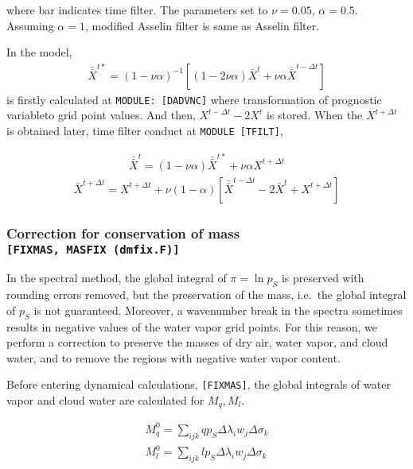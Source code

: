 where bar indicates time filter. The parameters set to \(\nu=0.05\),
\(\alpha=0.5\). Assuming \(\alpha=1\), modified Asselin filter is same
as Asselin filter.

In the model, \begin{eqnarray}
 \bar{\bar{X}}^{t*} = (1-\nu\alpha)^{-1}[(1-2\nu\alpha)\bar{X}^t +\nu\alpha \bar{\bar{X}}^{t-\Delta t} ]
\end{eqnarray} is firstly calculated at \texttt{MODULE:\ {[}DADVNC{]}} where
transformation of prognostic variableto grid point values. And then,
\(X^{t-\Delta t}-2X^t\) is stored. When the \(X^{t+\Delta t}\) is
obtained later, time filter conduct at \texttt{MODULE\ {[}TFILT{]}},

\begin{eqnarray}
 \bar{\bar{X}}^{t} = (1-\nu\alpha)\bar{\bar{X}}^{t*} +\nu\alpha X^{t+\Delta t} 
\end{eqnarray} \begin{eqnarray}
\bar{X}^{t+\Delta t} = X^{t+\Delta t} + \nu (1-\alpha)[ \bar{\bar{X}}^{t-\Delta t} - 2\bar{X}^{t} + X^{t+\Delta t}]
 \end{eqnarray}

\hypertarget{correction-for-conservation-of-mass-fixmas-masfix-dmfix.f}{%
\subsubsection{\texorpdfstring{Correction for conservation of mass
\texttt{{[}FIXMAS,\ MASFIX\ (dmfix.F){]}}}{Correction for conservation of mass {[}FIXMAS, MASFIX (dmfix.F){]}}}\label{correction-for-conservation-of-mass-fixmas-masfix-dmfix.f}}

In the spectral method, the global integral of \(\pi = \ln p_S\) is
preserved with rounding errors removed, but the preservation of the
mass, i.e.~the global integral of \(p_S\) is not guaranteed. Moreover, a
wavenumber break in the spectra sometimes results in negative values of
the water vapor grid points. For this reason, we perform a correction to
preserve the masses of dry air, water vapor, and cloud water, and to
remove the regions with negative water vapor content.

Before entering dynamical calculations, \texttt{{[}FIXMAS{]}}, the
global integrals of water vapor and cloud water are calculated for
\(M_q, M_l\).

\begin{eqnarray}
  M_q^0  =  \sum_{ijk} q p_S  \Delta\lambda_i w_j \Delta\sigma_k  \\
  M_l^0  =  \sum_{ijk} l p_S  \Delta\lambda_i w_j \Delta\sigma_k
\end{eqnarray}

